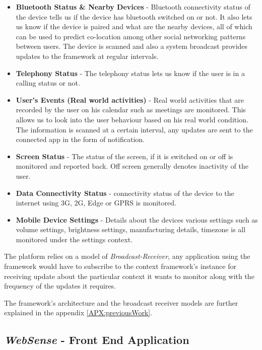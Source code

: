 \documentclass[prodmode,acmtecs]{acmsmall}
\begin{document}
\begin{itemize}
\item \textbf{Bluetooth Status \& Nearby Devices} - Bluetooth connectivity status of the device tells us if the device has bluetooth switched on or not. It also lets us know if the device is paired and what are the nearby devices, all of which can be used to predict co-location among other social networking patterns between users. The device is scanned and also a system broadcast provides updates to the framework at regular intervals.

\item \textbf{Telephony Status} - The telephony status lets us know if the user is in a calling status or not.

\item \textbf{User's Events (Real world activities)} - Real world activities that are recorded by the user on his calendar such as meetings are monitored. This allows us to look into the user behaviour based on his real world condition. The information is scanned at a certain interval, any updates are sent to the connected app in the form of notification.

\item \textbf{Screen Status} - The status of the screen, if it is switched on or off is monitored and reported back. Off screen generally denotes inactivity of the user.

\item \textbf{Data Connectivity Status} - connectivity status of the device to the internet using 3G, 2G, Edge or GPRS is monitored.

\item \textbf{Mobile Device Settings} - Details about the devices various settings such as volume settings, brightness settings, manufacturing details, timezone is all monitored under the settings context.

\end{itemize}

The platform relies on a model of \textit{Broadcast-Receiver}, any application using the framework would have to subscribe to the context framework's instance for receiving update about the particular context it wants to monitor along with the frequency of the updates it requires.

The framework's architecture and the broadcast receiver models are further explained in the appendix \ref{APX:previousWork}.

\subsection{\textit{WebSense} - Front End Application}
\end{document}
